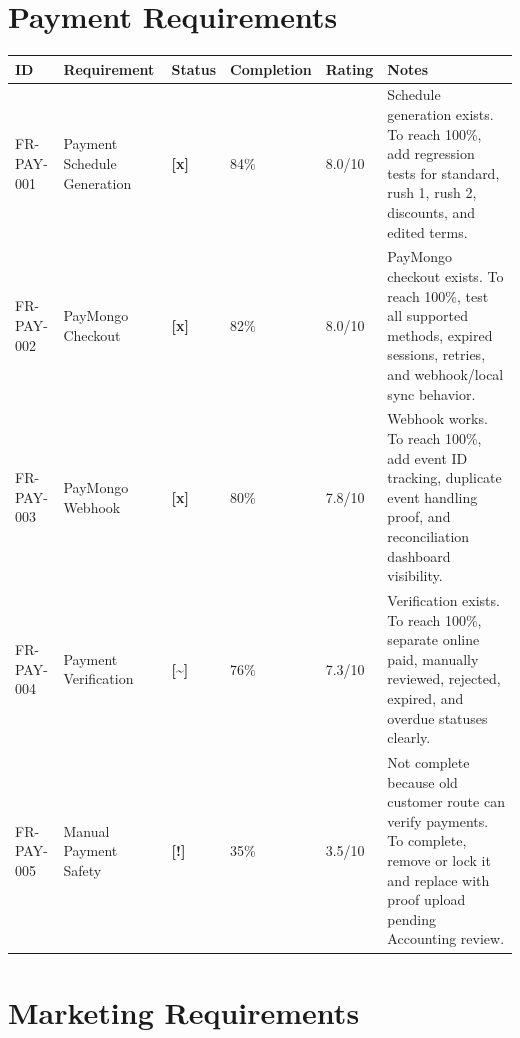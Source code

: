 \documentclass[11pt,a4paper]{article}
\newcommand{\statusdone}{\textbf{[x]}}
\newcommand{\statuspartial}{\textbf{[{\textasciitilde}]}}
\newcommand{\statusrisk}{\textbf{[!]}}
\begin{document}
\section{Payment Requirements}

\begin{longtable}{L{0.15\textwidth} L{0.22\textwidth} C{0.08\textwidth} C{0.10\textwidth} C{0.10\textwidth} L{0.25\textwidth}}
\toprule
\textbf{ID} & \textbf{Requirement} & \textbf{Status} & \textbf{Completion} & \textbf{Rating} & \textbf{Notes} \\
\midrule
FR-PAY-001 & Payment Schedule Generation & \statusdone & 84\% & 8.0/10 & Schedule generation exists. To reach 100\%, add regression tests for standard, rush 1, rush 2, discounts, and edited terms. \\
FR-PAY-002 & PayMongo Checkout & \statusdone & 82\% & 8.0/10 & PayMongo checkout exists. To reach 100\%, test all supported methods, expired sessions, retries, and webhook/local sync behavior. \\
FR-PAY-003 & PayMongo Webhook & \statusdone & 80\% & 7.8/10 & Webhook works. To reach 100\%, add event ID tracking, duplicate event handling proof, and reconciliation dashboard visibility. \\
FR-PAY-004 & Payment Verification & \statuspartial & 76\% & 7.3/10 & Verification exists. To reach 100\%, separate online paid, manually reviewed, rejected, expired, and overdue statuses clearly. \\
FR-PAY-005 & Manual Payment Safety & \statusrisk & 35\% & 3.5/10 & Not complete because old customer route can verify payments. To complete, remove or lock it and replace with proof upload pending Accounting review. \\
\bottomrule
\end{longtable}

\section{Marketing Requirements}
\end{document}
